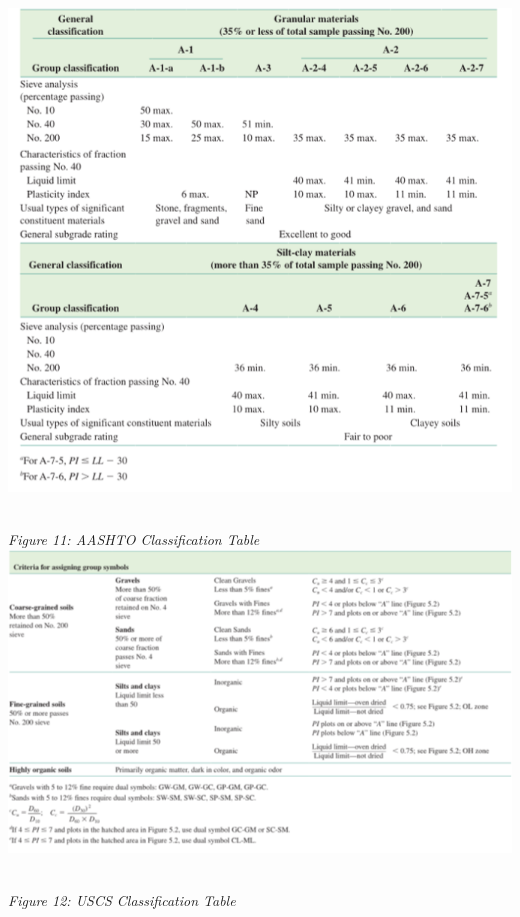 \documentclass{article}
\begin{document}
\begin{center}
\includegraphics*[scale=0.5]{fig3.png}
\emph{\\Figure 11: AASHTO Classification Table\\}
\includegraphics*[scale=0.8]{fig4.png}
\emph{\\Figure 12: USCS Classification Table\\}

\end{center}
\end{document}
